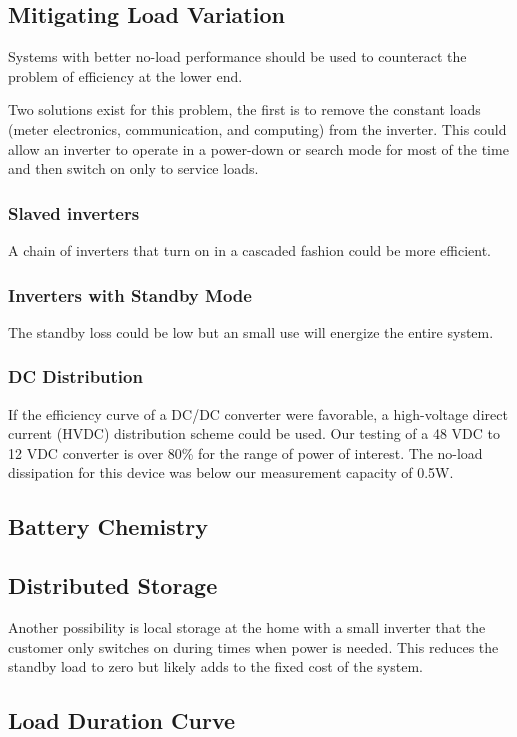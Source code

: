 \documentclass[conference]{IEEEtran}
\begin{document}
\subsection{Mitigating Load Variation}
Systems with better no-load performance should be used to counteract
the problem of efficiency at the lower end.

Two solutions exist for this problem, the first is to remove
the constant loads (meter electronics, communication, and
computing) from the inverter.
This could allow an inverter to operate in a power-down or
search mode for most of the time and then switch on only
to service loads.

\subsubsection{Slaved inverters}
A chain of inverters that turn on in a cascaded fashion could
be more efficient.

\subsubsection{Inverters with Standby Mode}
The standby loss could be low but an small use will energize the
entire system.

\subsubsection{DC Distribution}
If the efficiency curve of a DC/DC converter were favorable,
a high-voltage direct current (HVDC) distribution scheme could
be used.
Our testing of a 48 VDC to 12 VDC converter is over 80\% for
the range of power of interest.
The no-load dissipation for this device was below our measurement
capacity of 0.5W.


\subsection{Battery Chemistry}

\subsection{Distributed Storage}
Another possibility is local storage at the home with a small inverter
that the customer only switches on during times when power
is needed.
This reduces the standby load to zero but likely adds to the
fixed cost of the system.

\subsection{Load Duration Curve}
\end{document}
